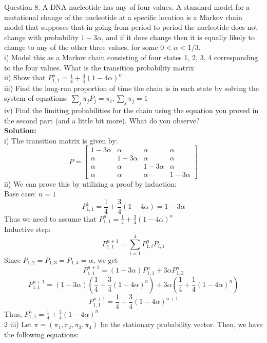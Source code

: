\documentclass[answers,12pt,addpoints]{exam}
\begin{document}
\begin{questions}
\question Question 8.
A DNA nucleotide has any of four values. A standard model for a mutational change of the
nucleotide at a specific location is a Markov chain model that supposes that in going from period
to period the nucleotide does not change with probability $1 - 3\alpha$, and if it does change then it is
equally likely to change to any of the other three values, for some $0 < \alpha < 1/3$.\\
i) Model this as a Markov chain consisting of four states {1, 2, 3, 4} corresponding to the four values. What is the transition probability matrix\\
ii) Show that $P_{1,1}^n = \frac{1}{4} + \frac{3}{4}(1-4\alpha)^n$\\
iii) Find the long-run proportion of time the chain is in each state by solving the system of equations: $\sum_j \pi_j P_j = \pi_i, \sum_j \pi_j = 1 $\\
iv) Find the limiting probabilities for the chain using the equation you proved
in the second part (and a little bit more). What do you observe?\\
\textbf{Solution:}\\
i) The transition matrix is given by:
$$P = \begin{bmatrix}
    1-3\alpha & \alpha & \alpha & \alpha\\
    \alpha & 1-3\alpha & \alpha & \alpha\\
    \alpha & \alpha & 1-3\alpha & \alpha\\
    \alpha & \alpha & \alpha & 1-3\alpha
\end{bmatrix}$$
ii) We can prove this by utilizing a proof by induction:\\
Base case: $n = 1$\\
$$P_{1,1}^1 = \frac{1}{4} + \frac{3}{4}(1-4\alpha) = 1-3\alpha$$
Thus we need to assume that $P_{1,1}^n = \frac{1}{4} + \frac{3}{4}(1-4\alpha)^n$\\
Inductive step:\\
$$P_{1,1}^{n+1} = \sum_{i=1}^4 P_{1,i}^nP_{i,1}$$
Since $P_{1,2} = P_{1,3} = P_{1,4} = \alpha$, we get
$$P_{1,1}^{n+1} = (1-3\alpha)P_{1,1}^n + 3\alpha P_{1,2}^n$$
$$P_{1,1}^{n+1} = (1-3\alpha)\left(\frac{1}{4} + \frac{3}{4}(1-4\alpha)^n\right) + 3\alpha\left(\frac{1}{4} + \frac{1}{4}(1-4\alpha)^n\right)$$
$$P_{1,1}^{n+1} = \frac{1}{4} + \frac{3}{4}(1-4\alpha)^{n+1}$$
Thus, $P_{1,1}^n = \frac{1}{4} + \frac{3}{4}(1-4\alpha)^n$\\2
iii) Let $\pi = (\pi_1, \pi_2, \pi_3, \pi_4)$ be the stationary probability vector. Then, we have the following equations:

\end{questions}
\end{document}
